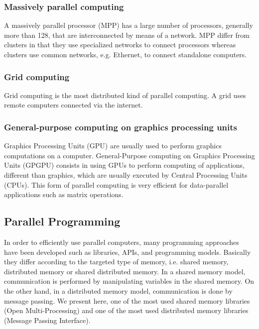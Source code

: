 \subsubsection{Massively parallel computing}
A massively parallel processor (MPP) has a large number of processors, generally more than 128, that are interconnected by means of a network. MPP differ from clusters in that they use specialized networks to connect processors whereas clusters use common networks, e.g. Ethernet, to connect standalone computers.

\subsubsection{Grid computing}
Grid computing is the most distributed kind of parallel computing. A grid uses remote computers connected via the internet.  
 
\subsubsection{General-purpose computing on graphics processing units}
Graphics Processing Units (GPU) are usually used to perform graphics computations on a computer. General-Purpose computing on Graphics Processing Units (GPGPU) consists in using GPUs to perform computing of applications, different than graphics, which are usually executed by Central Processing Units (CPUs). This form of parallel computing  is very efficient for data-parallel applications such as matrix operations.

\subsection{Parallel Programming}

In order to efficiently use parallel computers, many programming approaches have been developed such as libraries, APIs, and programming models. Basically they differ according to the targeted type of memory, i.e. shared memory, distributed memory or shared distributed memory. In a shared memory model, communication is performed by manipulating variables in the shared memory. On the other hand, in a distributed memory model, communication is done by message passing. We present here, one of the most used shared memory libraries (Open Multi-Processing) and one of the most used distributed memory libraries (Message Passing Interface).

